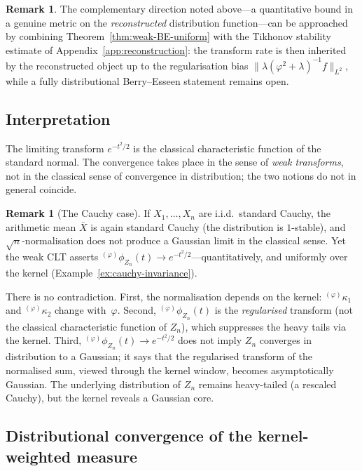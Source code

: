 \documentclass[12pt]{article}
\theoremstyle{definition}
\newtheorem{remark}[theorem]{Remark}
\begin{document}
\begin{remark}
The complementary direction noted above---a quantitative bound in a genuine
metric on the \emph{reconstructed} distribution function---can be approached
by combining Theorem~\ref{thm:weak-BE-uniform} with the Tikhonov stability
estimate of Appendix~\ref{app:reconstruction}: the transform rate is then
inherited by the reconstructed object up to the regularisation bias
$\bigl\|\lambda(\varphi^2+\lambda)^{-1}f\bigr\|_{L^2}$, while a fully
distributional Berry--Esseen statement remains open.
\end{remark}


\subsection{Interpretation}
\label{subsec:clt_discussion}

The limiting transform $e^{-t^2/2}$ is the classical characteristic function of the standard normal.  The convergence takes place in the sense of \emph{weak transforms}, not in the classical sense of convergence in distribution; the two notions do not in general coincide.

\begin{remark}[The Cauchy case]\label{rem:cauchy-paradox}
If $X_1,\ldots,X_n$ are i.i.d.\ standard Cauchy, the arithmetic mean $\bar X$ is again standard Cauchy (the distribution is $1$-stable), and $\sqrt{n}$-normalisation does not produce a Gaussian limit in the classical sense.  Yet the weak CLT asserts ${}^{(\varphi)}\phi_{Z_n}(t) \to e^{-t^2/2}$---quantitatively, and uniformly over the kernel (Example~\ref{ex:cauchy-invariance}).

There is no contradiction.  First, the normalisation depends on the kernel: ${}^{(\varphi)}\kappa_1$ and ${}^{(\varphi)}\kappa_2$ change with~$\varphi$.  Second, ${}^{(\varphi)}\phi_{Z_n}(t)$ is the \emph{regularised} transform (not the classical characteristic function of $Z_n$), which suppresses the heavy tails via the kernel.  Third, ${}^{(\varphi)}\phi_{Z_n}(t)\to e^{-t^2/2}$ does not imply $Z_n$ converges in distribution to a Gaussian; it says that the regularised transform of the normalised sum, viewed through the kernel window, becomes asymptotically Gaussian.  The underlying distribution of $Z_n$ remains heavy-tailed (a rescaled Cauchy), but the kernel reveals a Gaussian core.
\end{remark}


\subsection{Distributional convergence of the kernel-weighted measure}
\label{subsec:clt_distributional}
\end{document}
